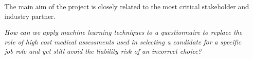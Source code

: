 




\noindent


The main aim of the project is closely related to the most critical stakeholder and industry partner. 


\textit{How can we apply machine learning techniques to a questionnaire to replace the role of high cost medical assessments used in selecting a candidate for a specific job role and yet still avoid the liability risk of an incorrect choice?}

